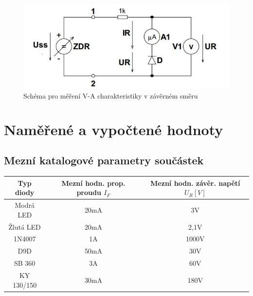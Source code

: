 \documentclass[12pt]{article} %
\begin{document}
\begin{figure}[H]
\includegraphics[scale=1]{zaverny.jpg}
\caption{Schéma pro měření V-A charakteristiky v závěrném směru}
\end{figure}
\newpage

\section*{Naměřené a vypočtené hodnoty}
\subsection*{Mezní katalogové parametry součástek}
\begin{tabular}{|c|c|c|}
\hline 
Typ diody & Mezní hodn. prop. proudu $I_F$ & Mezní hodn. závěr. napětí $U_R [V]$ \\ 
\hline 
Modrá LED & 20mA & 3V \\ 
\hline 
Žlutá LED & 20mA & 2,1V \\ 
\hline 
1N4007 & 1A & 1000V \\ 
\hline 
D9D & 50mA & 30V \\ 
\hline 
SB 360 & 3A & 60V \\ 
\hline 
KY 130/150 & 30mA & 180V \\ 
\hline 
\end{tabular}
\end{document}
